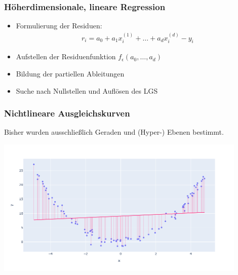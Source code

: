 
\begin{frame}
\frametitle{Höherdimensionale, lineare Regression}

\begin{itemize}
	\item Formulierung der Residuen: \begin{align*}
		r_i = a_0 + a_1 x^{(1)}_i + \dots + a_d x^{(d)}_i - y_i
	\end{align*}
	\item Aufstellen der Residuenfunktion $f_\epsilon(a_0, \dots, a_d)$
	\item Bildung der partiellen Ableitungen
	\item Suche nach Nullstellen und Auflösen des LGS
\end{itemize}

\end{frame}


\begin{frame}
\frametitle{Nichtlineare Ausgleichskurven}

Bisher wurden ausschließlich Geraden und (Hyper-) Ebenen bestimmt.

\begin{center}
	\includegraphics[width=0.9\textwidth]{fig8/squared.png}
\end{center}

\end{frame}


